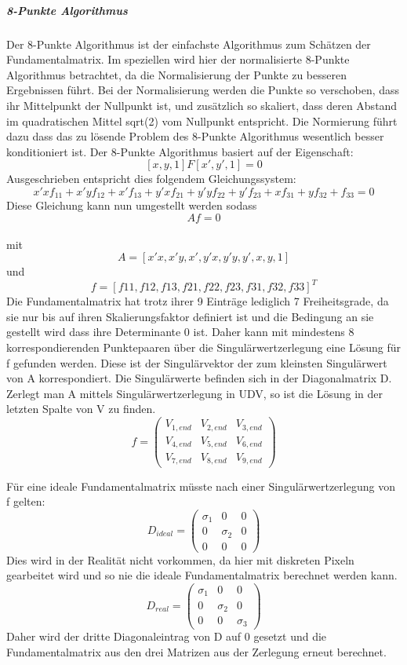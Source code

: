 \subparagraph{8-Punkte Algorithmus}
Der 8-Punkte Algorithmus ist der einfachste Algorithmus zum Schätzen der Fundamentalmatrix. Im speziellen wird hier der normalisierte 8-Punkte Algorithmus betrachtet, da die Normalisierung der Punkte zu besseren Ergebnissen führt.
Bei der Normalisierung werden die Punkte so verschoben, dass ihr Mittelpunkt der Nullpunkt ist, und zusätzlich so skaliert, dass deren Abstand im quadratischen Mittel sqrt(2) vom Nullpunkt entspricht. Die Normierung führt dazu dass das zu lösende Problem des 8-Punkte Algorithmus wesentlich besser konditioniert ist.
Der 8-Punkte Algorithmus basiert auf der Eigenschaft:
$$[x,y,1] F [x',y',1] = 0$$
Ausgeschrieben entspricht dies folgendem Gleichungssystem:
\\
$$x'xf_{11} + x'yf_{12}  + x'f_{13} + y'xf_{21} + y'yf_{22} + y'f_{23} + xf_{31} + yf_{32} + f_{33} = 0$$
Diese Gleichung kann nun umgestellt werden sodass
\\
$$Af = 0$$
\\
mit
$$A = [x'x, x'y, x', y'x, y'y, y', x,y,1]$$
und
$$f = [f11,f12,f13,f21,f22,f23,f31,f32,f33]^T$$
Die Fundamentalmatrix hat trotz ihrer 9 Einträge lediglich 7 Freiheitsgrade, da sie nur bis auf ihren Skalierungsfaktor definiert ist und die Bedingung an sie gestellt wird dass ihre Determinante 0 ist. Daher kann mit mindestens 8 korrespondierenden Punktepaaren über die Singulärwertzerlegung eine Lösung für f gefunden werden. Diese ist der Singulärvektor der zum kleinsten Singulärwert von A korrespondiert. Die Singulärwerte befinden sich in der Diagonalmatrix D. Zerlegt man A mittels Singulärwertzerlegung in UDV, so ist die Lösung in der letzten Spalte von V zu finden.
$$f = \begin{pmatrix} V_{1,end} & V_{2,end} & V_{3,end}\\V_{4,end} & V_{5,end} & V_{6,end} \\V_{7,end} & V_{8,end} & V_{9,end} \end{pmatrix} $$

Für eine ideale Fundamentalmatrix müsste nach einer Singulärwertzerlegung von f gelten:
$$D_{ideal} = \begin{pmatrix} \sigma_1 & 0 & 0\\0 & \sigma_2 & 0 \\0 & 0 & 0 \end{pmatrix}$$
Dies wird in der Realität nicht vorkommen, da hier mit diskreten Pixeln gearbeitet wird und so nie die ideale Fundamentalmatrix berechnet werden kann.
$$D_{real} = \begin{pmatrix} \sigma_1 & 0 & 0\\0 & \sigma_2 & 0 \\0 & 0 & \sigma_3 \end{pmatrix}$$
Daher wird der dritte Diagonaleintrag von D auf 0 gesetzt und die Fundamentalmatrix aus den drei Matrizen aus der Zerlegung erneut berechnet. \cite{Richard2000} \cite{Schreer2005}

